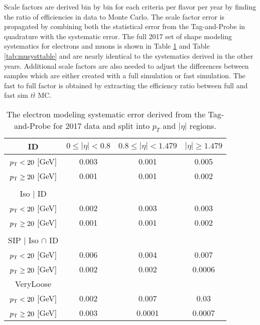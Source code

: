 Scale factors are derived bin by bin for each criteria per flavor per year by finding the ratio of efficiencies in data to Monte Carlo. The scale factor error is propagated by combining both the statistical error from the Tag-and-Probe in quadrature with the systematic error. The full 2017 set of shape modeling systematics for electrons and muons is shown in Table \ref{tab:elesysts} and Table \ref{tab:musysttable} and are nearly identical to the systematics derived in the other years. Additional scale factors are also needed to adjust the differences between samples which are either created with a full simulation or fast simulation. The fast to full factor is obtained by extracting the efficiency ratio between  full and fast sim $t\bar{t}$ MC.

	
\begin{table}
\centering
\caption{The electron modeling systematic error derived from the Tag-and-Probe for 2017 data and split into $p_T$ and $|\eta|$ regions. }
\label{tab:elesysts}
\begin{tabular}{|c|ccc|}
\hline
ID & $0\leq |\eta|<0.8$ & $0.8\leq |\eta|<1.479$ & $|\eta|\geq1.479$ \\
\hline
$p_{\mathrm{T}} < 20$ [GeV] & 0.003 & 0.001 & 0.005 \\
$p_{\mathrm{T}} \geq 20$ [GeV] & 0.001 & 0.001 & 0.002  \\
 &  &  &    \\
\hline
Iso $|$ ID  &  &  &   \\
\hline
$p_{\mathrm{T}} < 20$ [GeV] & 0.002 & 0.003 & 0.003   \\
$p_{\mathrm{T}} \geq 20$ [GeV] & 0.001 & 0.001 & 0.002 \\
 &  &  &   \\
\hline
SIP $|$ Iso $\cap$ ID &  &  &  \\
\hline
$p_{\mathrm{T}} < 20$ [GeV]& 0.006 & 0.004 & 0.007 \\
$p_{\mathrm{T}} \geq 20$ [GeV]& 0.002 & 0.002 & 0.0006  \\
\hline
VeryLoose &  &  &  \\
\hline
$p_{\mathrm{T}} < 20$ [GeV]& 0.002 & 0.007 & 0.03 \\
$p_{\mathrm{T}} \geq 20$ [GeV]& 0.003 & 0.0001 & 0.0007 \\
\hline
\end{tabular}
\end{table}



